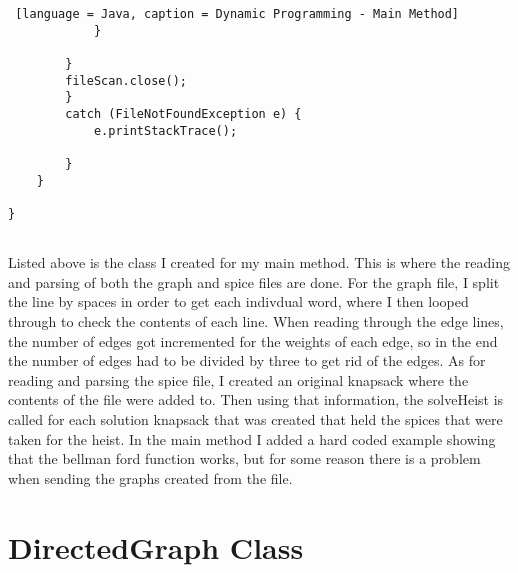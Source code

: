 \documentclass{article}
\begin{document}
\begin{lstlisting} [language = Java, caption = Dynamic Programming - Main Method]
            }
            
        }
        fileScan.close();            
        }
        catch (FileNotFoundException e) {
            e.printStackTrace();

        }
    }

}


\end{lstlisting}

\noindent Listed above is the class I created for my main method. This is where the reading and parsing of both the graph and spice files are done. For the graph file, I split the line by spaces in order to get each indivdual word, where I then looped through to check the contents of each line. When reading through the edge lines, the number of edges got incremented for the weights of each edge, so in the end the number of edges had to be divided by three to get rid of the edges. As for reading and parsing the spice file, I created an original knapsack where the contents of the file were added to. Then using that information, the solveHeist is called for each solution knapsack that was created that held the spices that were taken for the heist. In the main method I added a hard coded example showing that the bellman ford function works, but for some reason there is a problem when sending the graphs created from the file. 


\section{DirectedGraph Class}
\end{document}
